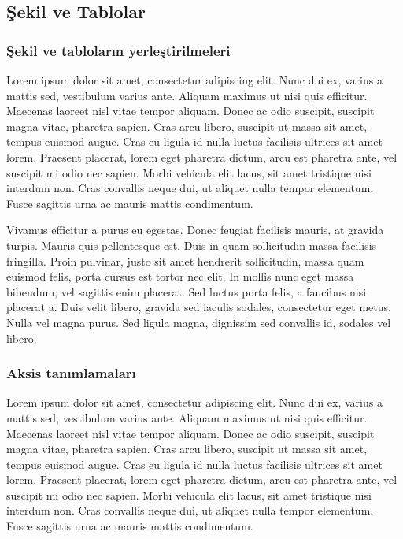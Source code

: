 \documentclass[conference]{IEEEtran}
\begin{document}
\subsection{Şekil ve Tablolar}

\subsubsection{Şekil ve tabloların yerleştirilmeleri} 
Lorem ipsum dolor sit amet, consectetur adipiscing elit. Nunc dui ex, varius a mattis sed, vestibulum varius ante. Aliquam maximus ut nisi quis efficitur. Maecenas laoreet nisl vitae tempor aliquam. Donec ac odio suscipit, suscipit magna vitae, pharetra sapien. Cras arcu libero, suscipit ut massa sit amet, tempus euismod augue. Cras eu ligula id nulla luctus facilisis ultrices sit amet lorem. Praesent placerat, lorem eget pharetra dictum, arcu est pharetra ante, vel suscipit mi odio nec sapien. Morbi vehicula elit lacus, sit amet tristique nisi interdum non. Cras convallis neque dui, ut aliquet nulla tempor elementum. Fusce sagittis urna ac mauris mattis condimentum.

Vivamus efficitur a purus eu egestas. Donec feugiat facilisis mauris, at gravida turpis. Mauris quis pellentesque est. Duis in quam sollicitudin massa facilisis fringilla. Proin pulvinar, justo sit amet hendrerit sollicitudin, massa quam euismod felis, porta cursus est tortor nec elit. In mollis nunc eget massa bibendum, vel sagittis enim placerat. Sed luctus porta felis, a faucibus nisi placerat a. Duis velit libero, gravida sed iaculis sodales, consectetur eget metus. Nulla vel magna purus. Sed ligula magna, dignissim sed convallis id, sodales vel libero.

\subsubsection{Aksis tanımlamaları} 
Lorem ipsum dolor sit amet, consectetur adipiscing elit. Nunc dui ex, varius a mattis sed, vestibulum varius ante. Aliquam maximus ut nisi quis efficitur. Maecenas laoreet nisl vitae tempor aliquam. Donec ac odio suscipit, suscipit magna vitae, pharetra sapien. Cras arcu libero, suscipit ut massa sit amet, tempus euismod augue. Cras eu ligula id nulla luctus facilisis ultrices sit amet lorem. Praesent placerat, lorem eget pharetra dictum, arcu est pharetra ante, vel suscipit mi odio nec sapien. Morbi vehicula elit lacus, sit amet tristique nisi interdum non. Cras convallis neque dui, ut aliquet nulla tempor elementum. Fusce sagittis urna ac mauris mattis condimentum.
\end{document}
